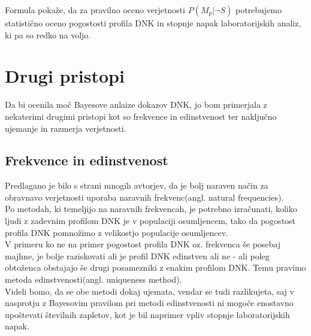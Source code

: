 \documentclass[12pt,a4paper]{amsart}
\theoremstyle{definition} %
\theoremstyle{plain} %
\begin{document}
Formula pokaže, da za pravilno oceno verjetnosti $P(M_p \lvert \neg S)$ potrebujemo statistično oceno pogostosti profila DNK in stopnje napak
laboratorijskih analiz, ki pa so redko na voljo. \vspace{3mm}
 
\section{Drugi pristopi}
Da bi ocenila moč Bayesove anlaize dokazov DNK, jo bom primerjala z nekaterimi drugimi pristopi kot so frekvence in edinstvenost ter naključno 
ujemanje in razmerja verjetnosti.

\subsection{Frekvence in edinstvenost}
Predlagano je bilo s strani mnogih avtorjev, da je bolj naraven način za obravnavo verjetnosti uporaba naravnih frekvenc(angl. natural
frequencies). \\
 
Po metodah, ki temeljijo na naravnih frekvencah, je potrebno izračunati, koliko ljudi z zadevnim profilom DNK je v populaciji osumljencem, tako
da pogostost profila DNK pomnožimo z velikostjo populacije osumljencev.  \\
V primeru ko ne na primer pogostost profila DNK oz. frekvenca še posebaj majhne, je bolje raziskovati ali je profil DNK edinstven ali ne - ali 
poleg obtoženca obstajajo še drugi posamezniki z enakim profilom DNK. Temu pravimo metoda edinstvenosti(angl. uniqueness method). \\

Videli bomo, da se obe metodi dokaj ujemata, vendar se tudi razlikujeta, saj v nasprotju z Bayesovim pravilom pri metodi edinstvenosti 
ni mogoče enostavno upoštevati številnih zapletov, kot je bil naprimer vpliv stopnje laboratorijskih napak. \\

\end{document}
